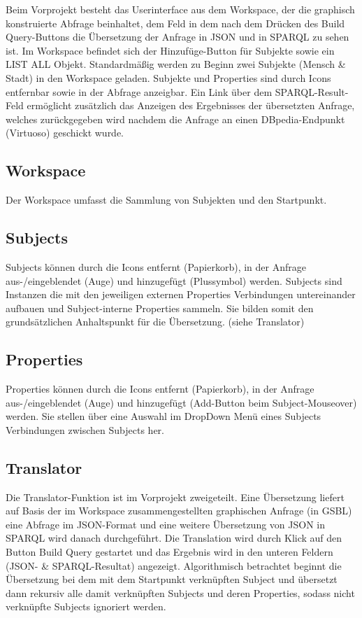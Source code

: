 Beim Vorprojekt besteht das Userinterface aus dem Workspace, der die graphisch konstruierte Abfrage beinhaltet, dem Feld in dem nach dem Drücken des {\glqq}Build Query{\grqq}-Buttons die Übersetzung der Anfrage in JSON und in SPARQL zu sehen ist. Im Workspace befindet sich der Hinzufüge-Button für Subjekte sowie ein LIST ALL Objekt. Standardmäßig werden zu Beginn zwei Subjekte (Mensch \& Stadt) in den Workspace geladen. Subjekte und Properties sind durch Icons entfernbar sowie in der Abfrage anzeigbar.
Ein Link über dem SPARQL-Result-Feld ermöglicht zusätzlich das Anzeigen des Ergebnisses der übersetzten Anfrage, welches zurückgegeben wird nachdem die Anfrage an einen DBpedia-Endpunkt (Virtuoso) geschickt wurde.

\subsection*{Workspace}

Der Workspace umfasst die Sammlung von Subjekten und den Startpunkt.

\subsection*{Subjects}

Subjects können durch die Icons entfernt (Papierkorb), in der Anfrage aus-/eingeblendet (Auge) und hinzugefügt (Plussymbol) werden.
Subjects sind Instanzen die mit den jeweiligen {\glqq}externen{\grqq} Properties Verbindungen untereinander aufbauen und Subject-interne Properties sammeln. Sie bilden somit den grundsätzlichen
Anhaltspunkt für die Übersetzung. (siehe Translator)

\subsection*{Properties}

Properties können durch die Icons entfernt (Papierkorb), in der Anfrage aus-/eingeblendet (Auge) und hinzugefügt (Add-Button beim Subject-Mouseover) werden.
Sie stellen über eine Auswahl im DropDown Menü eines Subjects Verbindungen zwischen Subjects her.

\subsection*{Translator}
\Hack{\enlargethispage{\baselineskip}}
Die Translator-Funktion ist im Vorprojekt zweigeteilt. Eine Übersetzung liefert auf Basis der im Workspace zusammengestellten graphischen Anfrage (in GSBL) eine Abfrage im
JSON-Format und eine weitere Übersetzung von JSON in SPARQL wird danach durchgeführt.
Die Translation wird durch Klick auf den Button {\glqq}Build Query{\grqq} gestartet und das Ergebnis wird in den unteren Feldern (JSON- \& SPARQL-Resultat) angezeigt.
Algorithmisch betrachtet beginnt die Übersetzung bei dem mit dem Startpunkt verknüpften Subject und übersetzt dann rekursiv alle damit verknüpften Subjects und deren Properties, sodass nicht verknüpfte Subjects ignoriert werden. 

